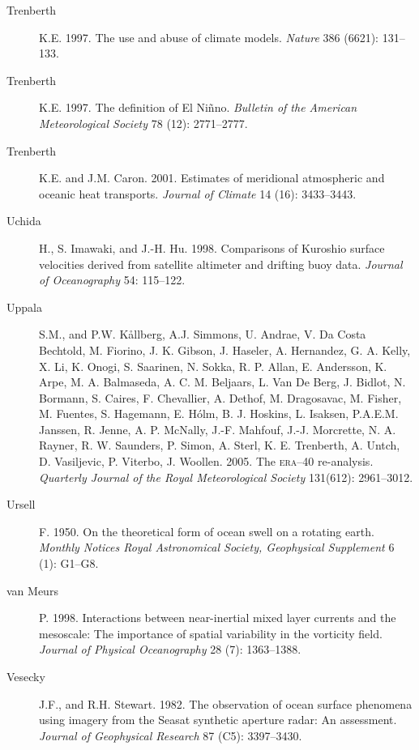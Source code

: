 \begin{description}
\item [Trenberth]K.E. 1997. The use and abuse of climate models. \textit{Nature} 386 (6621): 131--133.

\item [Trenberth]K.E. 1997. The definition of El Ni\~{n}no. \textit{Bulletin of the American Meteorological Society} 78 (12): 2771--2777.

\item [Trenberth]K.E. and J.M. Caron. 2001. Estimates of meridional atmospheric and oceanic heat transports. \textit{Journal of Climate} 14 (16): 3433--3443.

\item [Uchida]H., S. Imawaki, and J.-H. Hu. 1998. Comparisons of Kuroshio surface velocities
derived from satellite altimeter and drifting buoy data. \textit{Journal of Oceanography} 54: 115--122.

\item [Uppala]S.M., and P.W. K\r{a}llberg, A.J. Simmons, U. Andrae, V. Da Costa Bechtold, M. Fiorino, J. K. Gibson, J. Haseler, A. Hernandez, G. A. Kelly, X. Li, K. Onogi, S. Saarinen, N. Sokka, R. P. Allan, E. Andersson, K. Arpe, M. A. Balmaseda, A. C. M. Beljaars, L. Van De Berg, J. Bidlot, N. Bormann, S. Caires, F. Chevallier, A. Dethof, M. Dragosavac, M. Fisher, M. Fuentes, S. Hagemann, E. H\'{o}lm, B. J. Hoskins, L. Isaksen, P.A.E.M. Janssen, R. Jenne, A. P. McNally, J.-F. Mahfouf, J.-J. Morcrette, N. A. Rayner, R. W. Saunders, P. Simon, A. Sterl, K. E. Trenberth, A. Untch, D. Vasiljevic, P. Viterbo, J. Woollen. 2005. The \textsc{era}--40 re-analysis. \textit{Quarterly Journal of the Royal Meteorological Society} 131(612): 2961--3012.

\item [Ursell]F. 1950. On the theoretical form of ocean swell on a rotating
earth. \textit{Monthly Notices Royal Astronomical Society, Geophysical Supplement} 6 (1):
G1--G8.

\item [van Meurs]P. 1998. Interactions between near-inertial mixed layer
currents and the meso\-scale: The importance of spatial variability in the
vorticity field. \textit{Journal of Physical Oceanography} 28 (7): 1363--1388.

\item [Vesecky]J.F., and R.H. Stewart. 1982. The observation of ocean surface
phenomena using imagery from the Seasat synthetic aperture radar: An assessment.
\textit{Journal of Geophysical Research} 87 (C5): 3397--3430.


\end{description}

